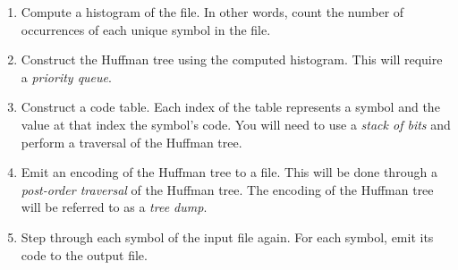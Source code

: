 \begin{enumerate}
  \item Compute a histogram of the file. In other words, count the
    number of occurrences of each unique symbol in the file.

  \item Construct the Huffman tree using the computed histogram. This
    will require a \emph{priority queue}.

  \item Construct a code table. Each index of the table represents a
    symbol and the value at that index the symbol's code. You will need
    to use a \emph{stack of bits} and perform a traversal of the Huffman
    tree.

  \item Emit an encoding of the Huffman tree to a file. This will be
    done through a \emph{post-order traversal} of the Huffman tree. The
    encoding of the Huffman tree will be referred to as a \emph{tree
    dump}.

  \item Step through each symbol of the input file again. For each
    symbol, emit its code to the output file.
\end{enumerate}
